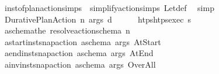 \begin{isabellebody}
\ inst{\isacharunderscore}{\kern0pt}of{\isacharunderscore}{\kern0pt}plan{\isacharunderscore}{\kern0pt}action{\isachardot}{\kern0pt}simps\ {}\ simplify{\isacharunderscore}{\kern0pt}action{\isachardot}{\kern0pt}simps\ Let{\isacharunderscore}{\kern0pt}def\ \isamarkupfalse%
\ simp\isanewline
\ \ \isamarkupfalse%
\isanewline
\ \ \ \ \isamarkupfalse%
\ {\isacharparenleft}{\kern0pt}Durative{\isacharunderscore}{\kern0pt}Plan{\isacharunderscore}{\kern0pt}Action\ n\ args\ d{\isacharparenright}{\kern0pt}\isanewline
\ \ \ \ \isamarkupfalse%
\ {\isacharquery}{\kern0pt}htps{\isacharequal}{\kern0pt}{\isachardoublequoteopen}htps{\isacharunderscore}{\kern0pt}exec\ {\isasympi}s{\isachardoublequoteclose}\isanewline
\ \ \ \ \isamarkupfalse%
\ {\isacharquery}{\kern0pt}a\isactrlsub s\isactrlsub c\isactrlsub h\isactrlsub e\isactrlsub m\isactrlsub a{\isacharequal}{\kern0pt}{\isachardoublequoteopen}the\ {\isacharparenleft}{\kern0pt}resolve{\isacharunderscore}{\kern0pt}action{\isacharunderscore}{\kern0pt}schema\ n{\isacharparenright}{\kern0pt}{\isachardoublequoteclose}\isanewline
\ \ \ \ \isamarkupfalse%
\ {\isacharquery}{\kern0pt}a\isactrlsub s\isactrlsub t\isactrlsub a\isactrlsub r\isactrlsub t{\isacharequal}{\kern0pt}{\isachardoublequoteopen}inst{\isacharunderscore}{\kern0pt}snap{\isacharunderscore}{\kern0pt}action\ {\isacharquery}{\kern0pt}a\isactrlsub s\isactrlsub c\isactrlsub h\isactrlsub e\isactrlsub m\isactrlsub a\ args\ At{\isacharunderscore}{\kern0pt}Start{\isachardoublequoteclose}\isanewline
\ \ \ \ \isamarkupfalse%
\ {\isacharquery}{\kern0pt}a\isactrlsub e\isactrlsub n\isactrlsub d{\isacharequal}{\kern0pt}{\isachardoublequoteopen}inst{\isacharunderscore}{\kern0pt}snap{\isacharunderscore}{\kern0pt}action\ {\isacharquery}{\kern0pt}a\isactrlsub s\isactrlsub c\isactrlsub h\isactrlsub e\isactrlsub m\isactrlsub a\ args\ At{\isacharunderscore}{\kern0pt}End{\isachardoublequoteclose}\isanewline
\ \ \ \ \isamarkupfalse%
\ {\isacharquery}{\kern0pt}a\isactrlsub i\isactrlsub n\isactrlsub v{\isacharequal}{\kern0pt}{\isachardoublequoteopen}inst{\isacharunderscore}{\kern0pt}snap{\isacharunderscore}{\kern0pt}action\ {\isacharquery}{\kern0pt}a\isactrlsub s\isactrlsub c\isactrlsub h\isactrlsub e\isactrlsub m\isactrlsub a\ args\ Over{\isacharunderscore}{\kern0pt}All{\isachardoublequoteclose}\isanewline
\ \ \ \ \isamarkupfalse%

\end{isabellebody}

